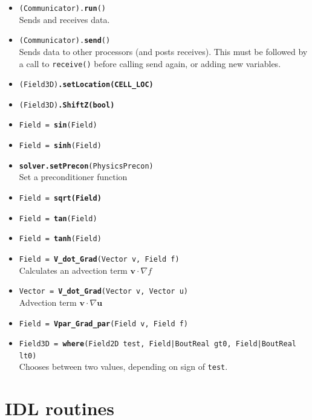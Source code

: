 \documentclass[12pt]{article}
\newcommand{\code}[1]{\texttt{#1}}
\begin{document}
\begin{itemize}
  \item \texttt{(Communicator).{\bf{run}}()} \\
    Sends and receives data.
  \item \texttt{(Communicator).{\bf{send}}()} \\
    Sends data to other processors (and posts receives). This must be followed
    by a call to \code{receive()} before calling send again, or adding new variables.
  \item \texttt{(Field3D)\bf{.setLocation}(CELL\_LOC)}
  \item \texttt{(Field3D)\bf{.ShiftZ}(bool)}
  \item \texttt{Field = {\bf{sin}}(Field)}
  \item \texttt{Field = {\bf{sinh}}(Field)}
  \item \texttt{{\bf solver.setPrecon}(PhysicsPrecon)} \\
    Set a preconditioner function
  \item \texttt{Field = \bf{sqrt}(Field)}
  \item \texttt{Field = {\bf tan}(Field)}
  \item \texttt{Field = {\bf tanh}(Field)}
  \item \texttt{Field = {\bf V\_dot\_Grad}(Vector v, Field f)} \\
    Calculates an advection term $\mathbf{v}\cdot\nabla f$
  \item \texttt{Vector = {\bf V\_dot\_Grad}(Vector v, Vector u)} \\
    Advection term $\mathbf{v}\cdot\nabla\mathbf{u}$
  \item \texttt{Field = {\bf Vpar\_Grad\_par}(Field v, Field f)}
  \item \texttt{Field3D = {\bf where}(Field2D test, Field|BoutReal gt0, Field|BoutReal lt0)} \\
    Chooses between two values, depending on sign of \code{test}.
\end{itemize}

\section{IDL routines}
\label{apx:idl_routines}
\end{document}
